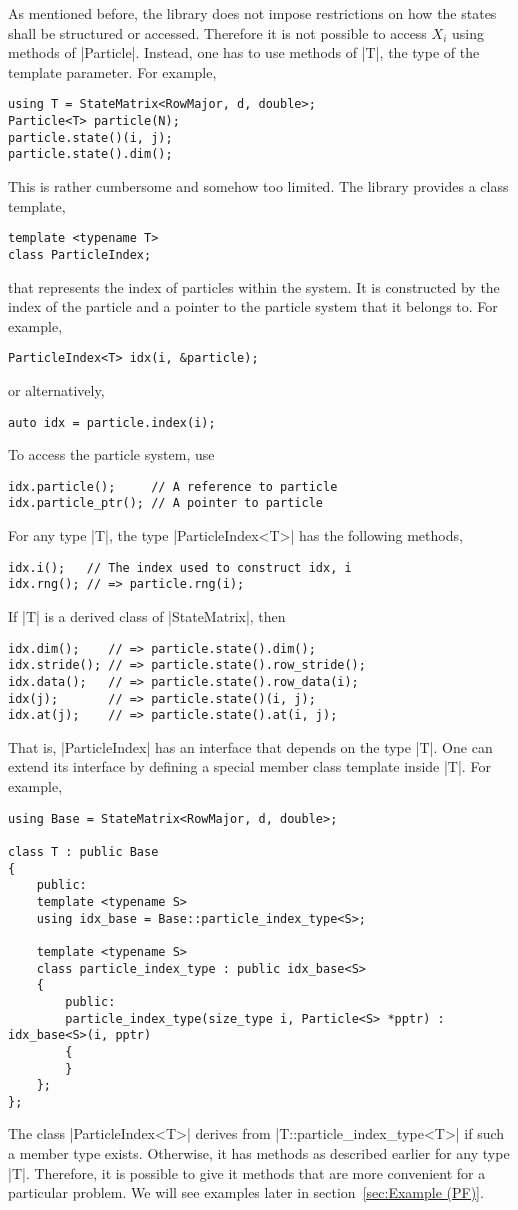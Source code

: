 As mentioned before, the library does not impose restrictions on how the states
shall be structured or accessed. Therefore it is not possible to access $X_i$
using methods of |Particle|. Instead, one has to use methods of |T|, the type
of the template parameter. For example,
\begin{verbatim}
using T = StateMatrix<RowMajor, d, double>;
Particle<T> particle(N);
particle.state()(i, j);
particle.state().dim();
\end{verbatim}
This is rather cumbersome and somehow too limited. The library provides a class
template,
\begin{verbatim}
template <typename T>
class ParticleIndex;
\end{verbatim}
that represents the index of particles within the system. It is constructed by
the index of the particle and a pointer to the particle system that it belongs
to. For example,
\begin{verbatim}
ParticleIndex<T> idx(i, &particle);
\end{verbatim}
or alternatively,
\begin{verbatim}
auto idx = particle.index(i);
\end{verbatim}
To access the particle system, use
\begin{verbatim}
idx.particle();     // A reference to particle
idx.particle_ptr(); // A pointer to particle
\end{verbatim}
For any type |T|, the type |ParticleIndex<T>| has the following methods,
\begin{verbatim}
idx.i();   // The index used to construct idx, i
idx.rng(); // => particle.rng(i);
\end{verbatim}
If |T| is a derived class of |StateMatrix|, then
\begin{verbatim}
idx.dim();    // => particle.state().dim();
idx.stride(); // => particle.state().row_stride();
idx.data();   // => particle.state().row_data(i);
idx(j);       // => particle.state()(i, j);
idx.at(j);    // => particle.state().at(i, j);
\end{verbatim}
That is, |ParticleIndex| has an interface that depends on the type |T|. One can
extend its interface by defining a special member class template inside |T|.
For example,
\begin{verbatim}
using Base = StateMatrix<RowMajor, d, double>;

class T : public Base
{
    public:
    template <typename S>
    using idx_base = Base::particle_index_type<S>;

    template <typename S>
    class particle_index_type : public idx_base<S>
    {
        public:
        particle_index_type(size_type i, Particle<S> *pptr) : idx_base<S>(i, pptr)
        {
        }
    };
};
\end{verbatim}
The class |ParticleIndex<T>| derives from |T::particle_index_type<T>| if such a
member type exists. Otherwise, it has methods as described earlier for any type
|T|. Therefore, it is possible to give it methods that are more convenient for
a particular problem. We will see examples later in section~\ref{sec:Example
(PF)}.

